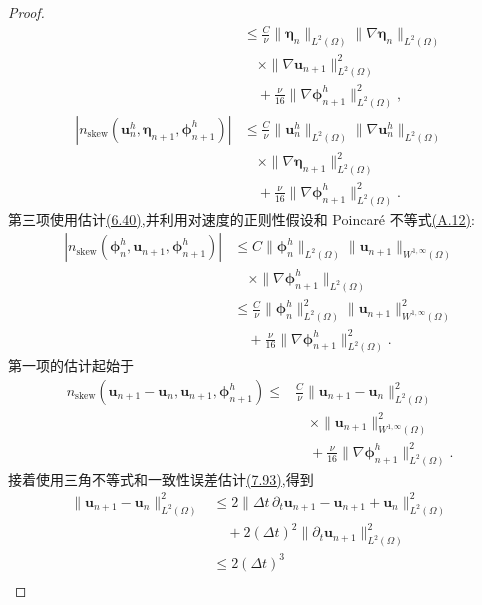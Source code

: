 \begin{proof}
\[\begin{aligned}
 &\le \frac{C}{\nu}
       \|\symbf{\eta}_n\|_{L^2(\Omega)}
       \|\nabla\symbf{\eta}_n\|_{L^2(\Omega)}\\
 &\quad\times\|\nabla\bm{u}_{n+1}\|_{L^2(\Omega)}^2\\
 &\quad+\frac{\nu}{16}\|\nabla\symbf{\phi}_{n+1}^h\|_{L^2(\Omega)}^2,\\
 |n_{\mathrm{skew}}(\bm{u}_n^h,\symbf{\eta}_{n+1},
                          \symbf{\phi}_{n+1}^h)|
 &\le \frac{C}{\nu}\|\bm{u}_n^h\|_{L^2(\Omega)}
       \|\nabla\bm{u}_n^h\|_{L^2(\Omega)}\\
 &\quad\times\|\nabla\symbf{\eta}_{n+1}\|_{L^2(\Omega)}^2\\
 &\quad+\frac{\nu}{16}\|\nabla\symbf{\phi}_{n+1}^h\|_{L^2(\Omega)}^2.
\end{aligned}
\]
第三项使用估计\hyperref[eq:steady-ns-conv-estimate-40]{(6.40)},并利用对速度的正则性假设和 Poincaré 不等式\hyperref[eq:appendix-a-12]{(A.12)}:
\[
\begin{aligned}
 |n_{\mathrm{skew}}(\symbf{\phi}_n^h,\bm{u}_{n+1},
                          \symbf{\phi}_{n+1}^h)|
 &\le C\|\symbf{\phi}_n^h\|_{L^2(\Omega)}
       \|\bm{u}_{n+1}\|_{W^{1,\infty}(\Omega)}\\
 &\quad\times\|\nabla\symbf{\phi}_{n+1}^h\|_{L^2(\Omega)}\\
 &\le \frac{C}{\nu}\|\symbf{\phi}_n^h\|_{L^2(\Omega)}^2
       \|\bm{u}_{n+1}\|_{W^{1,\infty}(\Omega)}^2\\
 &\quad+\frac{\nu}{16}\|\nabla\symbf{\phi}_{n+1}^h\|_{L^2(\Omega)}^2.
\end{aligned}
\]
第一项的估计起始于
\[
\begin{aligned}
 n_{\mathrm{skew}}(\bm{u}_{n+1}-\bm{u}_n,\bm{u}_{n+1},
                     \symbf{\phi}_{n+1}^h)
 \le{}&\frac{C}{\nu}\|\bm{u}_{n+1}-\bm{u}_n\|_{L^2(\Omega)}^2\\
 &\quad\times\|\bm{u}_{n+1}\|_{W^{1,\infty}(\Omega)}^2\\
 &\quad+\frac{\nu}{16}\|\nabla\symbf{\phi}_{n+1}^h\|_{L^2(\Omega)}^2.
\end{aligned}
\]
接着使用三角不等式和一致性误差估计\hyperref[eq:backward-difference-consistency]{(7.93)},得到
\[
\begin{aligned}
 \|\bm{u}_{n+1}-\bm{u}_n\|_{L^2(\Omega)}^2
 &\le 2\|\Delta t\,\partial_t\bm{u}_{n+1}
             -\bm{u}_{n+1}+\bm{u}_n\|_{L^2(\Omega)}^2
 \\
 &\quad+2(\Delta t)^2\|\partial_t\bm{u}_{n+1}\|_{L^2(\Omega)}^2\\
 &\le 2(\Delta t)^3\\

\end{aligned}\]
\end{proof}
